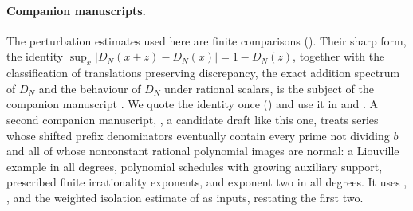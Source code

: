 \documentclass[11pt]{article}
\begin{document}
\paragraph{Companion manuscripts.} The perturbation estimates used here are finite comparisons
(). Their sharp form, the identity $\sup_x|D_N(x+z)-D_N(x)|=1-D_N(z)$, together with
the classification of translations preserving discrepancy, the exact addition spectrum of $D_N$ and
the behaviour of $D_N$ under rational scalars, is the subject of the companion manuscript
\cite{CompanionH}. We quote the identity once () and use it in 
and . A second companion manuscript, \cite{PaperXII}, a candidate draft like this one,
treats series whose shifted prefix denominators eventually contain every prime not dividing $b$ and all of
whose nonconstant rational polynomial images are normal: a Liouville example in all degrees, polynomial
schedules with growing auxiliary support, prescribed finite irrationality exponents, and exponent two in
all degrees. It uses , ,  and the weighted
isolation estimate of  as inputs, restating the first two.
\end{document}
